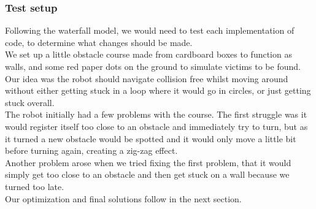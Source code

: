 \documentclass[conference]{IEEEtran}
\begin{document}
\subsubsection{Test setup}\label{test}
Following the waterfall model, we would need to test each implementation of code, to determine what changes should be made.\\
We set up a little obstacle course made from cardboard boxes to function as walls, and some red paper dots on the ground 
to simulate victims to be found. Our idea was the robot should navigate collision free whilst moving around without either 
getting stuck in a loop where it would go in circles, or just getting stuck overall. \\
The robot initially had a few problems with the course. The first struggle was it would register itself too close to an 
obstacle and immediately try to turn, but as it turned a new obstacle would be spotted and it would only move a little 
bit before turning again, creating a zig-zag effect. \\Another problem arose when we tried fixing the first problem, that 
it would simply get too close to an obstacle and then get stuck on a wall because we turned too late. \\
Our optimization and final solutions follow in the next section.
\\\\
\end{document}
